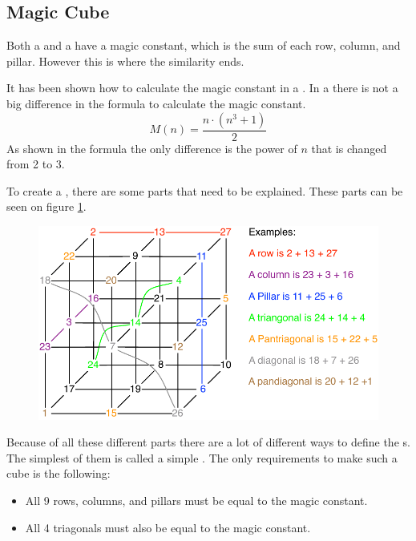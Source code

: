 \subsection{Magic Cube}
\label{sub:mcube}


Both a \msquare{} and a \mcube{} have a magic constant, which is the sum of each row, column, and pillar.
However this is where the similarity ends. 

It has been shown how to calculate the magic constant in a \msquare{}.
In a \mcube{} there is not a big difference in the formula to calculate the magic constant.
\begin{equation}
	M(n)=\frac{n \cdot (n^3+1)}{2}
\end{equation}
As shown in the formula the only difference is the power of $n$ that is changed from 2 to 3.

To create a  \mcube{}, there are some parts that need to be explained.
These parts can be seen on figure \ref{fig:cubeparts}.

\begin{figure}[htb]
	\centering
		\includegraphics[scale=0.5]{input/pics/cubeparts.pdf}
	\caption{}
	\label{fig:cubeparts}
\end{figure}

Because of all these different parts there are a lot of different ways to define the \mcube{}s.
The simplest of them is called a simple \mcube{}. The only requirements to make such a cube is the following:
\begin{itemize}
	\item All 9 rows, columns, and pillars must be equal to the magic constant.
	\item All 4 triagonals must also be equal to the magic constant.
\end{itemize}



